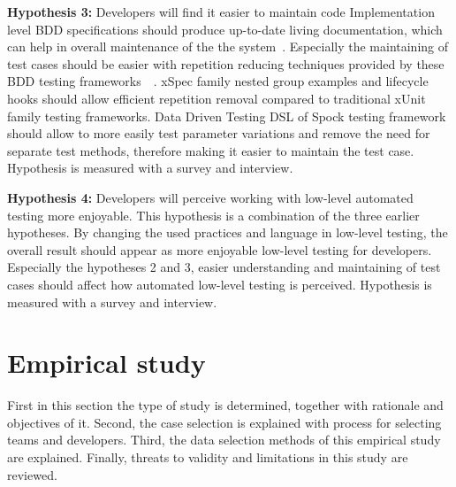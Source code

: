     \begin{addmargin}[0em]{0em}
    \vspace{10px}
    \textbf{Hypothesis 3:} Developers will find it easier to maintain code
    \vspace{5px}
    \newline
    Implementation level BDD specifications should produce up-to-date living documentation, which can help in overall
    maintenance of the the system~\cite{smart2014bdd}. Especially the maintaining of test cases should be easier
    with repetition reducing techniques provided by these BDD testing frameworks~\cite{chelimsky2010rspec}~\cite{kapelonis2016java}.
    xSpec family nested group examples and lifecycle hooks should allow efficient repetition removal compared to traditional xUnit family testing frameworks.
    Data Driven Testing DSL of Spock testing framework should allow to more easily test parameter variations and remove
    the need for separate test methods, therefore making it easier to maintain the test case.
    Hypothesis is measured with a survey and interview.
    \end{addmargin}

    \begin{addmargin}[0em]{0em}
    \vspace{10px}
    \textbf{Hypothesis 4:} Developers will perceive working with low-level automated testing more enjoyable.
    \vspace{5px}
    \newline
    This hypothesis is a combination of the three earlier hypotheses. By changing the used practices and language in low-level testing,
    the overall result should appear as more enjoyable low-level testing for developers. Especially the hypotheses 2 and 3, easier understanding
    and maintaining of test cases should affect how automated low-level testing is perceived.
    Hypothesis is measured with a survey and interview.
    \end{addmargin}

\section{Empirical study}
First in this section the type of study is determined, together with rationale and objectives of it. Second, the case selection
is explained with process for selecting teams and developers. Third, the data selection methods of this empirical study are
explained. Finally, threats to validity and limitations in this study are reviewed.

